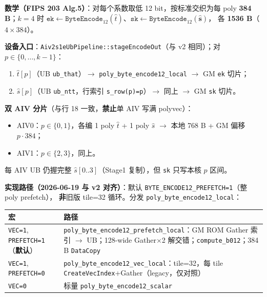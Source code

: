 \documentclass[UTF8,a4paper,11pt]{ctexart}
\begin{document}
\textbf{数学（FIPS 203 Alg.5）}：对每个系数取低 12 bit，按标准交织为每 poly \textbf{384 B}；$k{=}4$ 时
$\texttt{ek}\leftarrow \texttt{ByteEncode}_{12}(\hat{t})$、$\texttt{sk}\leftarrow \texttt{ByteEncode}_{12}(\hat{\mathbf{s}})$，
各 \textbf{1536 B}（$4{\times}384$）。

\textbf{设备入口}：\texttt{Aiv2s1eUbPipeline::stageEncodeOut}（与 v2 相同）；对 $p\in\{0,\ldots,k{-}1\}$：
\begin{enumerate}
  \item $\hat{t}[p]$（UB \texttt{ub\_that}）$\rightarrow$ \texttt{poly\_byte\_encode12\_local} $\rightarrow$ GM \texttt{ek} 切片；
  \item $\hat{s}[p]$（UB \texttt{ub\_ntt}，行索引 \texttt{s\_row(p)=p}）$\rightarrow$ 同上 $\rightarrow$ GM \texttt{sk} 切片。
\end{enumerate}

\textbf{双 AIV 分片}（与行 18 一致，\textbf{禁止}单 AIV 写满 polyvec）：
\begin{itemize}
  \item AIV0：$p\in\{0,1\}$，各编 1 poly $\hat{t}$ + 1 poly $\hat{s}$ $\rightarrow$ 本地 768 B + GM 偏移 $p{\cdot}384$；
  \item AIV1：$p\in\{2,3\}$，同上。
\end{itemize}
每 AIV UB 仍握完整 $\hat{s}[0..3]$（Stage1 复制），但 \texttt{sk} 只写本核 $p$ 区间。

\textbf{实现路径（2026-06-19 与 v2 对齐）}：默认 \texttt{BYTE\_ENCODE12\_PREFETCH=1}（整 poly prefetch），
\textbf{非}旧版 tile=32 循环。分发 \texttt{poly\_byte\_encode12\_local}：
\begin{table}[h]
  \centering
  \small
  \begin{tabular}{@{}L{3.6cm}L{8.4cm}@{}}
    \toprule
    宏 & 路径 \\
    \midrule
    \texttt{VEC=1}, \texttt{PREFETCH=1}（\textbf{默认}） & \texttt{poly\_byte\_encode12\_prefetch\_local}：GM ROM Gather 索引 $\rightarrow$ UB；128-wide Gather$\times$2 解交错；\texttt{compute\_b012}；384 B \texttt{DataCopy} \\
    \texttt{VEC=1}, \texttt{PREFETCH=0} & \texttt{poly\_byte\_encode12\_vec\_local}：tile=32，每 tile \texttt{CreateVecIndex}+Gather（legacy，仅对照） \\
    \texttt{VEC=0} & 标量 \texttt{poly\_byte\_encode12\_scalar} \\
    \bottomrule
  \end{tabular}
\end{table}
\end{document}
